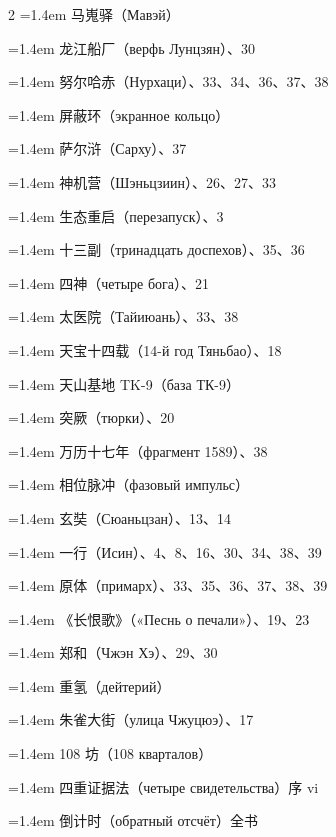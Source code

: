 {\begin{multicols}{2}
\hangindent=1.4em 马嵬驿（Мавэй）

\hangindent=1.4em 龙江船厂（верфь Лунцзян）、30

\hangindent=1.4em 努尔哈赤（Нурхаци）、33、34、36、37、38

\hangindent=1.4em 屏蔽环（экранное кольцо）

\hangindent=1.4em 萨尔浒（Сарху）、37

\hangindent=1.4em 神机营（Шэньцзиин）、26、27、33

\hangindent=1.4em 生态重启（перезапуск）、3

\hangindent=1.4em 十三副（тринадцать доспехов）、35、36

\hangindent=1.4em 四神（четыре бога）、21

\hangindent=1.4em 太医院（Тайиюань）、33、38

\hangindent=1.4em 天宝十四载（14-й год Тяньбао）、18

\hangindent=1.4em 天山基地 TK-9（база ТК-9）

\hangindent=1.4em 突厥（тюрки）、20

\hangindent=1.4em 万历十七年（фрагмент 1589）、38

\hangindent=1.4em 相位脉冲（фазовый импульс）

\hangindent=1.4em 玄奘（Сюаньцзан）、13、14

\hangindent=1.4em 一行（Исин）、4、8、16、30、34、38、39

\hangindent=1.4em 原体（примарх）、33、35、36、37、38、39

\hangindent=1.4em 《长恨歌》（«Песнь о печали»）、19、23

\hangindent=1.4em 郑和（Чжэн Хэ）、29、30

\hangindent=1.4em 重氢（дейтерий）

\hangindent=1.4em 朱雀大街（улица Чжуцюэ）、17

\hangindent=1.4em 108 坊（108 кварталов）

\hangindent=1.4em 四重证据法（четыре свидетельства）\dotfill 序 vi

\hangindent=1.4em 倒计时（обратный отсчёт）\dotfill 全书

\end{multicols}
}

\clearpage
